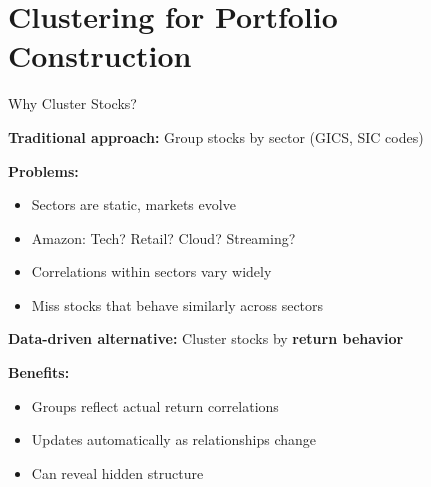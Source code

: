 \documentclass[10pt]{beamer}
\newcommand{\highlight}[1]{\textcolor{AccentOrange}{\textbf{#1}}}
\begin{document}
\section{Clustering for Portfolio Construction}

\begin{frame}{Why Cluster Stocks?}

  \textbf{Traditional approach:} Group stocks by sector (GICS, SIC codes)

  \vspace{0.5em}
  \textbf{Problems:}
  \begin{itemize}
    \item Sectors are static, markets evolve
    \item Amazon: Tech? Retail? Cloud? Streaming?
    \item Correlations within sectors vary widely
    \item Miss stocks that behave similarly across sectors
  \end{itemize}

  \vspace{1em}
  \textbf{Data-driven alternative:} Cluster stocks by \highlight{return behavior}

  \vspace{0.5em}
  \textbf{Benefits:}
  \begin{itemize}
    \item Groups reflect actual return correlations
    \item Updates automatically as relationships change
    \item Can reveal hidden structure
  \end{itemize}
\end{frame}

\end{document}
